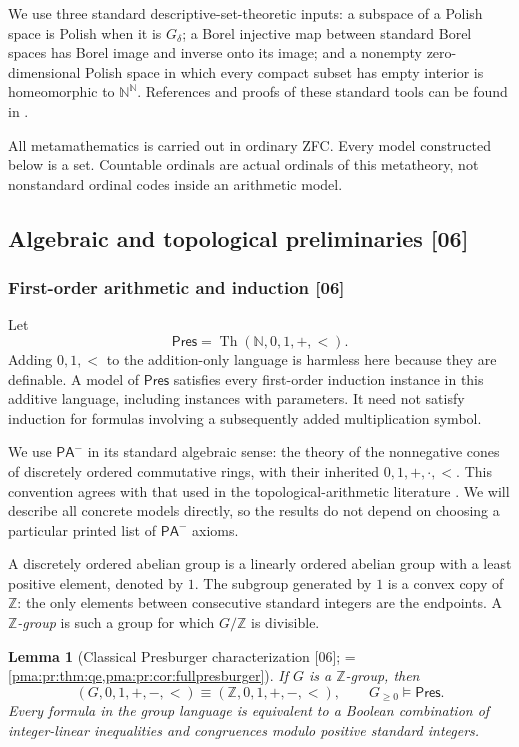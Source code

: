 \documentclass[11pt]{article}
\numberwithin{equation}{section}
\newtheorem{lemma}[lemma]{Lemma}
\theoremstyle{definition}
\theoremstyle{remark}
\newcommand{\N}{\mathbb N}
\newcommand{\Z}{\mathbb Z}
\newcommand{\Baire}{\N^{\N}}
\newcommand{\Th}{\operatorname{Th}}
\newcommand{\src}[1]{\textup{\textsf{\small[#1]}}}
\newcommand{\Pres}{\mathsf{Pres}}
\newcommand{\PAminus}{\mathsf{PA}^{-}}
\begin{document}
We use three standard descriptive-set-theoretic inputs: a subspace of a
Polish space is Polish when it is $G_\delta$; a Borel injective map between
standard Borel spaces has Borel image and inverse onto its image; and a
nonempty zero-dimensional Polish space in which every compact subset has
empty interior is homeomorphic to $\Baire$. References and proofs of these
standard tools can be found in \cite{Tserunyan,Kechris}.

All metamathematics is carried out in ordinary ZFC. Every model constructed
below is a set. Countable ordinals are actual ordinals of this metatheory,
not nonstandard ordinal codes inside an arithmetic model.

\subsection{Algebraic and topological preliminaries \src{06}}
\label{pma:cp:sec:prelim}

\subsubsection{First-order arithmetic and induction \src{06}}

Let
\[
 \Pres=\Th(\N,0,1,+,<).
\]
Adding $0,1,< $ to the addition-only language is harmless here because
they are definable. A model of $\Pres$ satisfies every first-order
induction instance in this additive language, including instances with
parameters. It need not satisfy induction for formulas involving a
subsequently added multiplication symbol.

We use $\PAminus$ in its standard algebraic sense: the theory of the
nonnegative cones of discretely ordered commutative rings, with their
inherited $0,1,+,\cdot,<$. This convention agrees with that used in
the topological-arithmetic literature \cite{EHW}. We will describe all
concrete models directly, so the results do not depend on choosing a
particular printed list of $\PAminus$ axioms.

A discretely ordered abelian group is a linearly ordered abelian group
with a least positive element, denoted by $1$. The subgroup generated by
$1$ is a convex copy of $\Z$: the only elements between consecutive
standard integers are the endpoints. A \emph{$\Z$-group} is such a group
for which $G/\Z$ is divisible.

\begin{lemma}[Classical Presburger characterization \src{06}; = \cref{pma:pr:thm:qe,pma:pr:cor:fullpresburger}]
\label{pma:cp:lem:zgroup}
If $G$ is a $\Z$-group, then
\[
 (G,0,1,+,-,<)\equiv(\Z,0,1,+,-,<),
 \qquad G_{\geq0}\models\Pres.
\]
Every formula in the group language is equivalent to a Boolean
combination of integer-linear inequalities and congruences modulo
positive standard integers.
\end{lemma}
\end{document}
